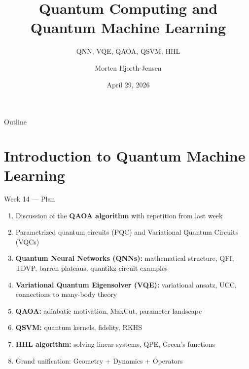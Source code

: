 \documentclass[aspectratio=169,10pt]{beamer}
\title[QC and QML -- Week 14]{Quantum Computing and Quantum Machine Learning}
\subtitle{QNN, VQE, QAOA, QSVM, HHL}
\author[M.~Hjorth-Jensen]{Morten Hjorth-Jensen}
\institute[UiO]{Department of Physics \& CCSE\\University of Oslo}
\date{April 29, 2026}
\begin{document}

\begin{frame}
  \titlepage
\end{frame}

\begin{frame}{Outline}
  \tableofcontents[hidesubsections]
\end{frame}

\section{Introduction to Quantum Machine Learning}

\begin{frame}{Week 14 — Plan}
  \begin{enumerate}\itemsep4pt
    \item Discussion of the \textbf{QAOA algorithm} with repetition from last week
    \item Parametrized quantum circuits (PQC) and Variational Quantum Circuits (VQCs)
    \item \textbf{Quantum Neural Networks (QNNs):} mathematical structure, QFI, TDVP,
          barren plateaus, quantikz circuit examples
    \item \textbf{Variational Quantum Eigensolver (VQE):} variational ansatz, UCC,
          connections to many-body theory
    \item \textbf{QAOA:} adiabatic motivation, MaxCut, parameter landscape
    \item \textbf{QSVM:} quantum kernels, fidelity, RKHS
    \item \textbf{HHL algorithm:} solving linear systems, QPE, Green's functions
    \item Grand unification: Geometry + Dynamics + Operators
  \end{enumerate}
\end{frame}
\end{document}
